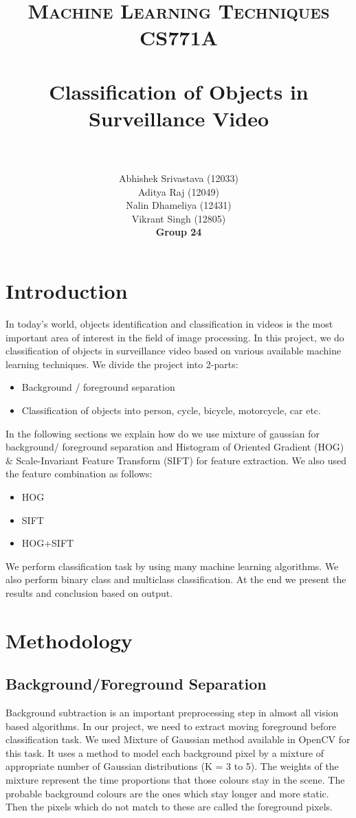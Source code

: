 \documentclass[paper=a4, fontsize=11pt]{scrartcl}
\title{
		\usefont{OT1}{bch}{b}{n}
		\normalfont \normalsize \textsc{Machine Learning Techniques CS771A} \\ [20pt]
		\horrule{0.5pt} \\[0.4cm]
		\huge Classification of Objects in Surveillance Video \\
		\horrule{2pt} \\[0.5cm]
}
\author{
		\normalfont 								\LARGE Abhishek Srivastava (12033)\\
\LARGE Aditya Raj (12049)\\
\LARGE Nalin Dhameliya (12431)\\
\LARGE Vikrant Singh (12805)\\
\LARGE \textbf{Group 24}\\
}
\numberwithin{equation}{section}		%
\numberwithin{figure}{section}			%
\numberwithin{table}{section}				%
\begin{document}
\maketitle
\section{\textbf{Introduction}}
In today's world, objects identification and classification in videos is the most important area of interest in the field of image processing. In this project, we do classification of objects in surveillance video based on various available machine learning techniques. We divide the project into 2-parts:
\begin{itemize} \setlength\itemsep{-3pt}
\item Background / foreground separation 
\item Classification of objects into person, cycle, bicycle, motorcycle, car etc. \\
\end{itemize}
In the following sections we explain how do we use mixture of gaussian for background/ foreground separation and Histogram of Oriented Gradient (HOG) \& Scale-Invariant Feature Transform (SIFT) for feature extraction. We also used the feature combination as follows:
\begin{itemize} \setlength\itemsep{-3pt}
\item HOG
\item SIFT
\item HOG+SIFT
\end{itemize}
We perform classification task by using many machine learning algorithms. We also perform binary class and multiclass classification. At the end we present the results and conclusion based on output.

\section{\textbf{Methodology}}
\subsection*{\textbf{Background/Foreground Separation} }
\noindent Background subtraction is an important preprocessing step in almost all vision based algorithms. In our project, we need to extract moving foreground before classification task. We used Mixture of Gaussian method available in OpenCV for this task. It uses a method to model each background pixel by a mixture of appropriate number of Gaussian distributions (K = 3 to 5). The weights of the mixture represent the time proportions that those colours stay in the scene. The probable background colours are the ones which stay longer and more static. Then the pixels which do not match to these are called the foreground pixels. \\
\end{document}
